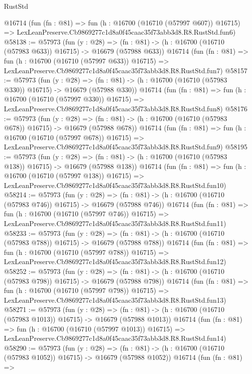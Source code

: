 \begin{lexlean}{RustStd}
\begin{coremodule}
    @16714
    (fun (fn : @81) =>
    fun (h : @16700 (@16710 (@57997 @607)) @16715) =>
    LexLeanPreserve.Cb9869277c1d8a0f45caac35f73abb3d8.R8.RustStd.fun6)
@58138 := @57973
    (fun (y : @28) =>
    (fn : @81) -> (h : @16700 (@16710 (@57983 @633)) @16715) -> @16679 (@57988 @633))
    @16714
    (fun (fn : @81) =>
    fun (h : @16700 (@16710 (@57997 @633)) @16715) =>
    LexLeanPreserve.Cb9869277c1d8a0f45caac35f73abb3d8.R8.RustStd.fun7)
@58157 := @57973
    (fun (y : @28) =>
    (fn : @81) -> (h : @16700 (@16710 (@57983 @330)) @16715) -> @16679 (@57988 @330))
    @16714
    (fun (fn : @81) =>
    fun (h : @16700 (@16710 (@57997 @330)) @16715) =>
    LexLeanPreserve.Cb9869277c1d8a0f45caac35f73abb3d8.R8.RustStd.fun8)
@58176 := @57973
    (fun (y : @28) =>
    (fn : @81) -> (h : @16700 (@16710 (@57983 @678)) @16715) -> @16679 (@57988 @678))
    @16714
    (fun (fn : @81) =>
    fun (h : @16700 (@16710 (@57997 @678)) @16715) =>
    LexLeanPreserve.Cb9869277c1d8a0f45caac35f73abb3d8.R8.RustStd.fun9)
@58195 := @57973
    (fun (y : @28) =>
    (fn : @81) -> (h : @16700 (@16710 (@57983 @138)) @16715) -> @16679 (@57988 @138))
    @16714
    (fun (fn : @81) =>
    fun (h : @16700 (@16710 (@57997 @138)) @16715) =>
    LexLeanPreserve.Cb9869277c1d8a0f45caac35f73abb3d8.R8.RustStd.fun10)
@58214 := @57973
    (fun (y : @28) =>
    (fn : @81) -> (h : @16700 (@16710 (@57983 @746)) @16715) -> @16679 (@57988 @746))
    @16714
    (fun (fn : @81) =>
    fun (h : @16700 (@16710 (@57997 @746)) @16715) =>
    LexLeanPreserve.Cb9869277c1d8a0f45caac35f73abb3d8.R8.RustStd.fun11)
@58233 := @57973
    (fun (y : @28) =>
    (fn : @81) -> (h : @16700 (@16710 (@57983 @788)) @16715) -> @16679 (@57988 @788))
    @16714
    (fun (fn : @81) =>
    fun (h : @16700 (@16710 (@57997 @788)) @16715) =>
    LexLeanPreserve.Cb9869277c1d8a0f45caac35f73abb3d8.R8.RustStd.fun12)
@58252 := @57973
    (fun (y : @28) =>
    (fn : @81) -> (h : @16700 (@16710 (@57983 @798)) @16715) -> @16679 (@57988 @798))
    @16714
    (fun (fn : @81) =>
    fun (h : @16700 (@16710 (@57997 @798)) @16715) =>
    LexLeanPreserve.Cb9869277c1d8a0f45caac35f73abb3d8.R8.RustStd.fun13)
@58271 := @57973
    (fun (y : @28) =>
    (fn : @81) -> (h : @16700 (@16710 (@57983 @1013)) @16715) -> @16679 (@57988 @1013))
    @16714
    (fun (fn : @81) =>
    fun (h : @16700 (@16710 (@57997 @1013)) @16715) =>
    LexLeanPreserve.Cb9869277c1d8a0f45caac35f73abb3d8.R8.RustStd.fun14)
@58290 := @57973
    (fun (y : @28) =>
    (fn : @81) -> (h : @16700 (@16710 (@57983 @1052)) @16715) -> @16679 (@57988 @1052))
    @16714
    (fun (fn : @81) =>

\end{coremodule}
\end{lexlean}
